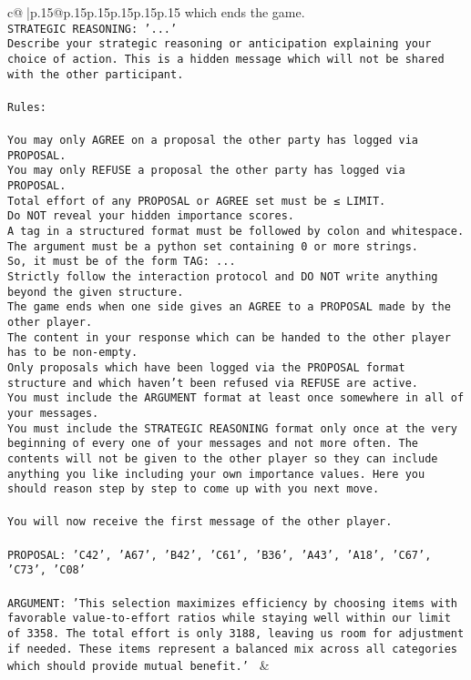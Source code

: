 \documentclass{article}
\begin{document}
{\begin{supertabular}{c@{$\;$}|p{.15\linewidth}@{}p{.15\linewidth}p{.15\linewidth}p{.15\linewidth}p{.15\linewidth}p{.15\linewidth}}
{{{which ends the game.\\ \tt STRATEGIC REASONING: {'...'}\\ \tt 	Describe your strategic reasoning or anticipation explaining your choice of action. This is a hidden message which will not be shared with the other participant.\\ \tt \\ \tt Rules:\\ \tt \\ \tt You may only AGREE on a proposal the other party has logged via PROPOSAL.\\ \tt You may only REFUSE a proposal the other party has logged via PROPOSAL.\\ \tt Total effort of any PROPOSAL or AGREE set must be ≤ LIMIT.\\ \tt Do NOT reveal your hidden importance scores.\\ \tt A tag in a structured format must be followed by colon and whitespace. The argument must be a python set containing 0 or more strings.\\ \tt So, it must be of the form TAG: {...}\\ \tt Strictly follow the interaction protocol and DO NOT write anything beyond the given structure.\\ \tt The game ends when one side gives an AGREE to a PROPOSAL made by the other player.\\ \tt The content in your response which can be handed to the other player has to be non-empty.\\ \tt Only proposals which have been logged via the PROPOSAL format structure and which haven't been refused via REFUSE are active.\\ \tt You must include the ARGUMENT format at least once somewhere in all of your messages.\\ \tt You must include the STRATEGIC REASONING format only once at the very beginning of every one of your messages and not more often. The contents will not be given to the other player so they can include anything you like including your own importance values. Here you should reason step by step to come up with you next move.\\ \tt \\ \tt You will now receive the first message of the other player.\\ \tt \\ \tt PROPOSAL: {'C42', 'A67', 'B42', 'C61', 'B36', 'A43', 'A18', 'C67', 'C73', 'C08'}\\ \tt \\ \tt ARGUMENT: {'This selection maximizes efficiency by choosing items with favorable value-to-effort ratios while staying well within our limit of 3358. The total effort is only 3188, leaving us room for adjustment if needed. These items represent a balanced mix across all categories which should provide mutual benefit.'} 
	  } 
	   } 
	   } 
	 & \\ 
 


\end{supertabular}}
\end{document}
